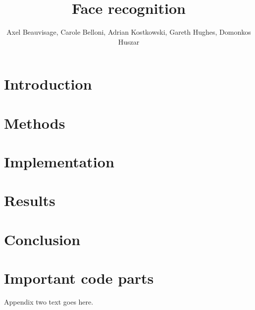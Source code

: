 \documentclass[journal]{IEEEtran}
\begin{document}
%
\title{Face recognition}

\author{Axel Beauvisage, Carole Belloni, Adrian Kostkowski, Gareth Hughes, Domonkos Huszar}


\maketitle


\begin{abstract}


\end{abstract}


\IEEEpeerreviewmaketitle
\section{Introduction}


\section {Methods}


\section {Implementation}


\section{Results}


\section{Conclusion}

\appendices

\section{Important code parts}
Appendix two text goes here.




\end{document}
